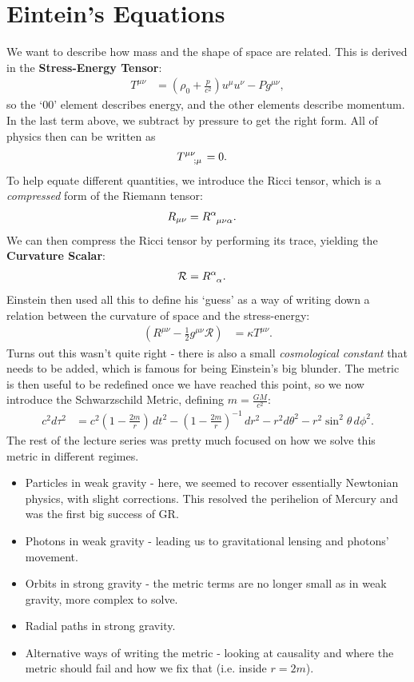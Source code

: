 \documentclass[a4paper, 11pt, normalem]{report}
\begin{document}
\section{Eintein's Equations}
We want to describe how mass and the shape of space are related. 
This is derived in the \textbf{Stress-Energy Tensor}:
\begin{align}
    T^{\mu\nu} &= \left(\rho_0+\frac{p}{c^2}\right)u^\mu u^\nu - Pg^{\mu\nu},
\end{align}
so the `00' element describes energy, and the other elements describe momentum. 
In the last term above, we subtract by pressure to get the right form. 
All of physics then can be written as
\begin{align}
    \tensor{T}{^{\mu\nu}_{;\mu}} &= 0.
\end{align}
To help equate different quantities, we introduce the Ricci tensor, which is a \emph{compressed} form of the Riemann tensor:
\begin{align}
    R_{\mu\nu} &= \tensor{R}{^\alpha_{\mu\nu\alpha}}.
\end{align}
We can then compress the Ricci tensor by performing its trace, yielding the \textbf{Curvature Scalar}:
\begin{align}
    \mathcal{R} &= \tensor{R}{^\alpha_\alpha}.
\end{align}
Einstein then used all this to define his `guess' as a way of writing down a relation between the curvature of space and the stress-energy:
\begin{align}
    \left(R^{\mu\nu}-\frac12 g^{\mu\nu}\mathcal{R}\right) &= \kappa T^{\mu\nu}.
\end{align}
Turns out this wasn't quite right - there is also a small \emph{cosmological constant} that needs to be added, which is famous for being Einstein's big blunder. 
The metric is then useful to be redefined once we have reached this point, so we now introduce the Schwarzschild Metric, defining $m=\frac{GM}{c^2}$:
\begin{align}
    c^2d\tau^2 &= c^2\left(1-\frac{2m}{r}\right)\,dt^2 - \left(1-\frac{2m}{r}\right)^{-1}\,dr^2 - r^2d\theta^2 - r^2\sin^2\theta\,d\phi^2.
\end{align}
The rest of the lecture series was pretty much focused on how we solve this metric in different regimes.
\begin{itemize}
    \item Particles in weak gravity - here, we seemed to recover essentially Newtonian physics, with slight corrections. This resolved the perihelion of Mercury and was the first big success of GR.
    \item Photons in weak gravity - leading us to gravitational lensing and photons' movement. 
    \item Orbits in strong gravity - the metric terms are no longer small as in weak gravity, more complex to solve.
    \item Radial paths in strong gravity.
    \item Alternative ways of writing the metric - looking at causality and where the metric should fail and how we fix that (i.e. inside $r=2m$).
\end{itemize}
\end{document}
